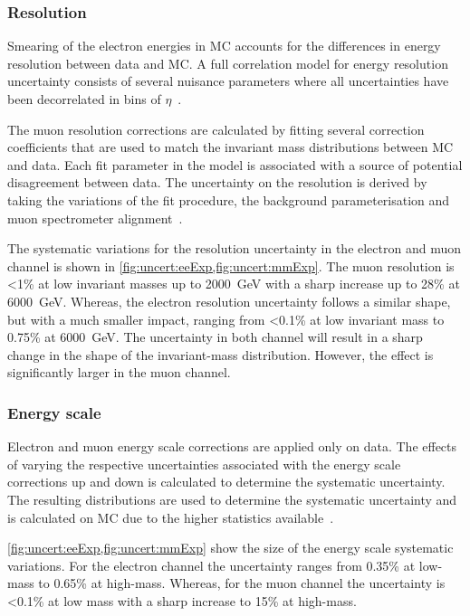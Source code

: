 \subsubsection{Resolution}
Smearing of the electron energies in MC accounts for the differences in energy resolution between data and MC. A full correlation model for energy resolution uncertainty consists of several nuisance parameters where all uncertainties have been decorrelated in bins of $\eta$~\cite{Aad:2019tso}.

The muon resolution corrections are calculated by fitting several correction coefficients that are used to match the invariant mass distributions between MC and data. Each fit parameter in the model is associated with a source of potential disagreement between data. The uncertainty on the resolution is derived by taking the variations of the fit procedure, the background parameterisation and muon spectrometer alignment~\cite{Aad:2016jkr}. 

The systematic variations for the resolution uncertainty in the electron and muon channel is shown in \cref{fig:uncert:eeExp,fig:uncert:mmExp}. The muon resolution is <1\% at low invariant masses up to \SI{2000}{\giga\electronvolt} with a sharp increase up to 28\% at \SI{6000}{\giga\electronvolt}. Whereas, the electron resolution uncertainty follows a similar shape, but with a much smaller impact, ranging from <0.1\% at low invariant mass to 0.75\% at \SI{6000}{\giga\electronvolt}. The uncertainty in both channel will result in a sharp change in the shape of the invariant-mass distribution. However, the effect is significantly larger in the muon channel. 


\subsubsection{Energy scale}
Electron and muon energy scale corrections are applied only on data. The effects of varying the respective uncertainties associated with the energy scale corrections up and down is calculated to determine the systematic uncertainty. The resulting distributions are used to determine the systematic uncertainty and is calculated on MC due to the higher statistics available~\cite{Aad:2019tso}. 

\cref{fig:uncert:eeExp,fig:uncert:mmExp} show the size of the energy scale systematic variations. For the electron channel the uncertainty ranges from 0.35\% at low-mass to 0.65\% at high-mass. Whereas, for the muon channel the uncertainty is <0.1\% at low mass with a sharp increase to 15\% at high-mass. 

